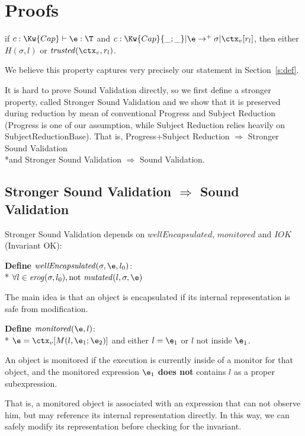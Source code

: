 \appendix
\section{Proofs} 

\begin{Theorem}
if $c:\Kw{Cap}\vdash \e: \T$ and
$c:\Kw{Cap}\{\_;\_\}|\e\rightarrow^+ \sigma|\ctx_v[r_l]$, then
either $H(\sigma,l)$ or $\mathit{trusted}(\ctx_v,r_l)$.
\end{Theorem}

We believe this property captures very precisely our statement in Section~\ref{s:def}.

It is hard to prove Sound Validation directly,
so we first define a stronger property,
called Stronger Sound Validation and
we show that it is preserved during reduction by mean of conventional 
Progress and Subject Reduction (Progress is one of our assumption,
while Subject Reduction relies heavily on SubjectReductionBase).
That is,
Progress+Subject Reduction $\Rightarrow$ Stronger Sound Validation
\\*and Stronger Sound Validation $\Rightarrow$ Sound Validation.

\subsection{Stronger Sound Validation $\Rightarrow$ Sound Validation}

Stronger Sound Validation depends on 
$\mathit{wellEncapsulated}$, $\mathit{monitored}$
and $IOK$ (Invariant OK):

\noindent\textbf{Define} $\mathit{wellEncapsulated}(\sigma,\e,l_0)$:\\*
${}_{}$\quad\quad$\forall l \in \mathit{erog}(\sigma,l_0), \text{not}\ \mathit{mutated}(l,\sigma,\e)$

\noindent The main idea is that an object is encapsulated if its internal representation is safe from
modification. 

\noindent\textbf{Define} $\mathit{monitored}(\e,l)$:\\*
${}_{}$\quad\quad  $\e=\ctx_v[M(l,\e_1;\e_2)]$ and either $l=\e_1$ or $l$ not inside $\e_1$.

\noindent An object is monitored if the execution
is currently inside of a monitor for that object, and
the monitored expression $\e_1$ \textbf{does not}
contains $l$ as a proper subexpression.

That is, a monitored object is associated with an expression that can not observe him, but may 
reference its internal representation directly.
In this way, we can safely modify its representation before checking for the invariant.

